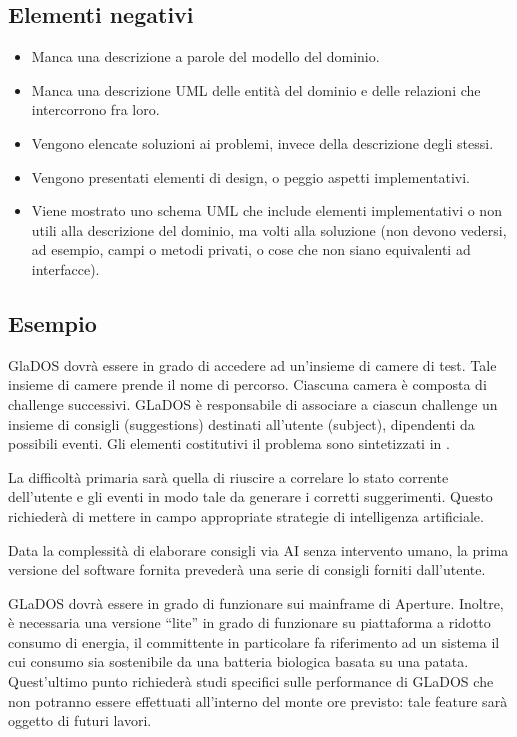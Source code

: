 \documentclass[a4paper,12pt]{report}
\begin{document}
\subsection*{Elementi negativi}
\begin{itemize}
	\item Manca una descrizione a parole del modello del dominio.
	\item Manca una descrizione UML delle entità del dominio e delle relazioni che intercorrono fra loro.
	\item Vengono elencate soluzioni ai problemi, invece della descrizione degli stessi.
	\item Vengono presentati elementi di design, o peggio aspetti implementativi.
	\item Viene mostrato uno schema UML che include elementi implementativi o non utili alla descrizione del dominio, ma volti alla soluzione (non devono vedersi, ad esempio, campi o metodi privati, o cose che non siano equivalenti ad interfacce).
\end{itemize}

\subsection*{Esempio}
GlaDOS dovrà essere in grado di accedere ad un'insieme di camere di test.
%
Tale insieme di camere prende il nome di percorso.
%
Ciascuna camera è composta di challenge successivi.
%
GLaDOS è responsabile di associare a ciascun challenge un insieme di consigli (suggestions) destinati all'utente (subject), dipendenti da possibili eventi.
%
Gli elementi costitutivi il problema sono sintetizzati in .

La difficoltà primaria sarà quella di riuscire a correlare lo stato corrente dell'utente e gli eventi in modo tale da generare i corretti suggerimenti.
%
Questo richiederà di mettere in campo appropriate strategie di intelligenza artificiale.

Data la complessità di elaborare consigli via AI senza intervento umano, la prima versione del software fornita prevederà una serie di consigli forniti dall'utente.

GLaDOS dovrà essere in grado di funzionare sui mainframe di Aperture.
%
Inoltre, è necessaria una versione ``lite'' in grado di funzionare su piattaforma a ridotto consumo di energia, il committente in particolare fa riferimento ad un sistema il cui consumo sia sostenibile da una batteria biologica basata su una patata.
%
Quest'ultimo punto richiederà studi specifici sulle performance di GLaDOS che non potranno essere effettuati all'interno del monte ore previsto: tale feature sarà oggetto di futuri lavori.
\end{document}
